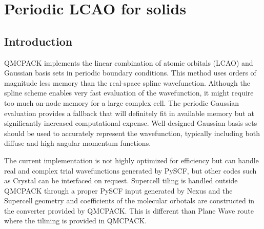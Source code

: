 \chapter{Periodic LCAO for solids}
\label{chap:LCAO}

\section{Introduction}

QMCPACK implements the linear combination of atomic orbitals (LCAO) and Gaussian
basis sets in periodic boundary conditions. This method uses orders of
magnitude less memory than the real-space spline wavefunction. Although
the spline scheme enables very fast evaluation of the wavefunction, it might
require too much on-node memory for a large complex cell. The periodic
Gaussian evaluation provides a fallback that will definitely fit in
available memory but at significantly increased computational
expense. Well-designed Gaussian basis sets should be used to accurately
represent the wavefunction, typically
including both diffuse and high angular momentum functions.

The current implementation is not highly optimized for efficiency but can handle real and complex trial wavefunctions generated by PySCF\cite{Sun2018}, but other codes such as
Crystal can be interfaced on request. Supercell tiling is handled outside QMCPACK through a proper PySCF input generated by Nexus and the Supercell geometry and coefficients of the molecular orbotals are constructed in the converter provided by QMCPACK. This is different than Plane Wave route where the tilining is provided in QMCPACK.   

